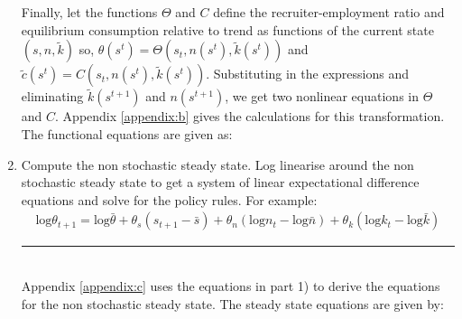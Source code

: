 \documentclass[11pt,letterpaper]{article}
\newcommand{\Hline}{\noindent\rule{17cm}{0.5pt}}
\begin{document}
\begin{enumerate}
Finally, let the functions $\Theta$ and $C$ define the
recruiter-employment ratio and equilibrium consumption relative to
trend as functions of the current state $(s,n,\tilde{k})$ so,
$\theta(s^t) = \Theta(s_t, n(s^t), \tilde{k}(s^t))$ and
$\tilde{c}(s^t) = C(s_t, n(s^t), \tilde{k}(s^t))$. Substituting in the
expressions and eliminating $\tilde{k}(s^{t+1})$ and $n(s^{t+1})$, we
get two nonlinear equations in $\Theta$ and $C$. Appendix
\ref{appendix:b} gives the calculations for this transformation. The
functional equations are given as:

\item Compute the non stochastic steady state. Log linearise around
  the non stochastic steady state to get a system of linear
  expectational difference equations and solve for the policy
  rules. For example:
  \begin{align*}
    \text{log}\theta_{t+1} = \text{log}\bar{\theta} + \theta_s
    (s_{t+1}-\bar{s}) + \theta_n (\text{log}n_t - \text{log}\bar{n}) +
    \theta_k (\text{log}k_t - \text{log}\bar{k})
  \end{align*}
\Hline \\
Appendix \ref{appendix:c} uses the equations in part 1) to derive the
equations for the non stochastic steady state. The steady state
equations are given by:


\end{enumerate}
\end{document}
